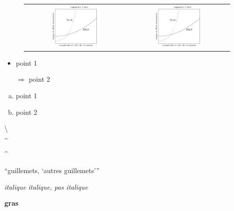 \documentclass[a4paper, 10pt]{article}\usepackage[]{graphicx}\usepackage[]{xcolor}
\begin{document}
 \begin{figure}[!ht]
  \begin{tabular}{cc}
    \includegraphics[width=0.5\textwidth]{Images/latex_word.png} & \includegraphics[width=0.5\textwidth]{Images/latex_word.png} \\
    \end{tabular}
 \end{figure}

\begin{itemize}
  \item point 1
  \item[$\Rightarrow$] point 2
\end{itemize}

\begin{enumerate}[(a)]%
  \item point 1
  \item point 2
\end{enumerate}

\textbackslash\\
\textasciitilde

\textasciicircum

\enquote{guillemets, \enquote{autres guillemets}}

\textit{italique}
\emph{italique, \emph{pas italique}}

\textbf{gras}
\end{document}
